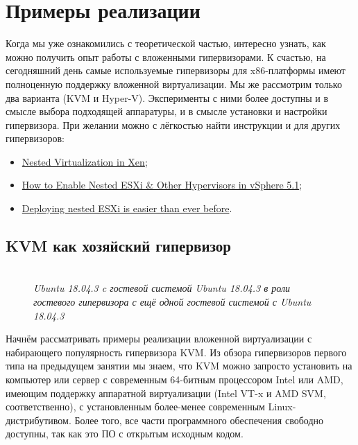 \documentclass[14pt, a4paper]{article}
\begin{document}
\section*{Примеры реализации}

Когда мы уже ознакомились с теоретической частью, интересно узнать, как можно получить опыт
работы с вложенными гипервизорами. К счастью, на сегодняшний день самые используемые
гипервизоры для x86-платформы имеют полноценную поддержку вложенной виртуализации. Мы же
рассмотрим только два варианта (KVM и Hyper-V). Эксперименты с ними более доступны и в смысле
выбора подходящей аппаратуры, и в смысле установки и настройки гипервизора. При желании можно
с лёгкостью найти инструкции и для других гипервизоров:

\begin{itemize}
    \item \href{https://wiki.xenproject.org/wiki/Nested_Virtualization_in_Xen}{Nested Virtualization in Xen};
    \item \href{https://www.virtuallyghetto.com/2012/08/how-to-enable-nested-esxi-other.html}{How to Enable Nested ESXi \& Other Hypervisors in vSphere 5.1};
    \item \href{https://www.altaro.com/vmware/deploying-nested-esxi-is-easier-than-ever-before/}{Deploying nested ESXi is easier than ever before}.
\end{itemize}

\newpage
\subsection*{KVM как хозяйский гипервизор}

\begin{figure}[h]
    \centering
    \\
    \small\textit{Ubuntu 18.04.3 c гостевой системой Ubuntu 18.04.3 в роли гостевого гипервизора с ещё одной гостевой системой с
    Ubuntu 18.04.3}
    \label{framework} 
\end{figure}

Начнём рассматривать примеры реализации вложенной виртуализации с набирающего популярность
гипервизора KVM. Из обзора гипервизоров первого типа на предыдущем занятии мы знаем, что KVM
можно запросто установить на компьютер или сервер с современным 64-битным процессором Intel
или AMD, имеющим поддержку аппаратной виртуализации (Intel VT-x и AMD SVM, соответственно), с
установленным более-менее современным Linux-дистрибутивом. Более того, все части программного
обеспечения свободно доступны, так как это ПО с открытым исходным кодом.
\end{document}
